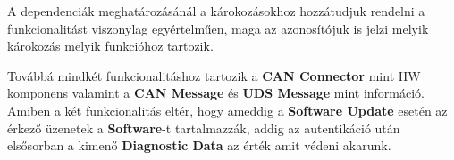 A dependenciák meghatározásánál a károkozásokhoz hozzátudjuk rendelni a funkcionalitást viszonylag egyértelműen, maga az azonosítójuk is jelzi melyik károkozás melyik funkcióhoz tartozik.

Továbbá mindkét funkcionalitáshoz tartozik a \textbf{CAN Connector} mint HW komponens valamint a \textbf{CAN Message} és \textbf{UDS Message} mint információ. Amiben a két funkcionalitás eltér, hogy ameddig a \textbf{Software Update} esetén az érkező üzenetek a \textbf{Software}-t tartalmazzák, addig az autentikáció után elsősorban a kimenő \textbf{Diagnostic Data} az érték amit védeni akarunk.


